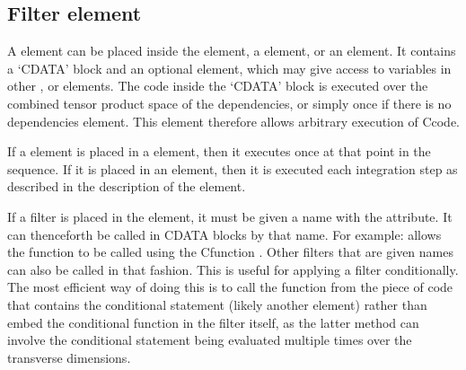 \documentclass[letterpaper,10pt,english]{sphinxmanual}
\begin{document}
\subsection{Filter element}
\label{\detokenize{reference_elements:filter-element}}\label{\detokenize{reference_elements:filterelement}}\label{\detokenize{reference_elements:index-65}}
\sphinxAtStartPar
A  element can be placed inside the  element, a {\hyperref[\detokenize{reference_elements:sequenceelement}]{}} element, or an {\hyperref[\detokenize{reference_elements:integrateelement}]{}} element.  It contains a ‘CDATA’ block and an optional {\hyperref[\detokenize{reference_elements:dependencies}]{}} element, which may give access to variables in other ,  or  elements.  The code inside the ‘CDATA’ block is executed over the combined tensor product space of the dependencies, or simply once if there is no dependencies element.  This element therefore allows arbitrary execution of C\sphinxhyphen{}code.

\ignorespaces 
\sphinxAtStartPar
If a  element is placed in a  element, then it executes once at that point in the sequence.  If it is placed in an  element, then it is executed each integration step as described in the description of the {\hyperref[\detokenize{reference_elements:filterselement}]{}} element.

\sphinxAtStartPar
If a filter is placed in the  element, it must be given a name with the  attribute.  It can thenceforth be called in CDATA blocks by that name.  For example:  allows the function to be called using the C\sphinxhyphen{}function .  Other filters that are given names can also be called in that fashion. This is useful for applying a filter conditionally.  The most efficient way of doing this is to call the function from the piece of code that contains the conditional statement (likely another  element) rather than embed the conditional function in the filter itself, as the latter method can involve the conditional statement being evaluated multiple times over the transverse dimensions.
\end{document}
